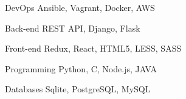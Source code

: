

\begin{cvskills}

  \cvskill
    {DevOps} %
    {Ansible, Vagrant, Docker, AWS} %

  \cvskill
    {Back-end} %
    {REST API, Django, Flask} %

  \cvskill
    {Front-end} %
    {Redux, React, HTML5, LESS, SASS} %

  \cvskill
    {Programming} %
    {Python, C, Node.js, JAVA} %

  \cvskill
    {Databases} %
    {Sqlite, PostgreSQL, MySQL} %

\end{cvskills}
